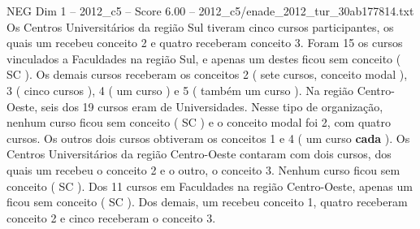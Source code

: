 \begin{textsample}{NEG Dim 1 – 2012\_c5 – Score 6.00 – 2012\_c5/enade\_2012\_tur\_30ab177814.txt}
Os Centros Universitários da região Sul tiveram cinco cursos participantes, os quais um recebeu conceito 2 e quatro receberam conceito 3.
Foram 15 os cursos vinculados a Faculdades na região Sul, e apenas um destes ficou sem conceito ( SC ).
Os demais cursos receberam os conceitos 2 ( sete cursos, conceito modal ), 3 ( cinco cursos ), 4 ( um curso ) e 5 ( também um curso ).
Na região Centro-Oeste, seis dos 19 cursos eram de Universidades.
Nesse tipo de organização, nenhum curso ficou sem conceito ( SC ) e o conceito modal foi 2, com quatro cursos.
Os outros dois cursos obtiveram os conceitos 1 e 4 ( um curso \textbf{cada} ).
Os Centros Universitários da região Centro-Oeste contaram com dois cursos, dos quais um recebeu o conceito 2 e o outro, o conceito 3.
Nenhum curso ficou sem conceito ( SC ).
Dos 11 cursos em Faculdades na região Centro-Oeste, apenas um ficou sem conceito ( SC ).
Dos demais, um recebeu conceito 1, quatro receberam conceito 2 e cinco receberam o conceito 3.

\end{textsample}

